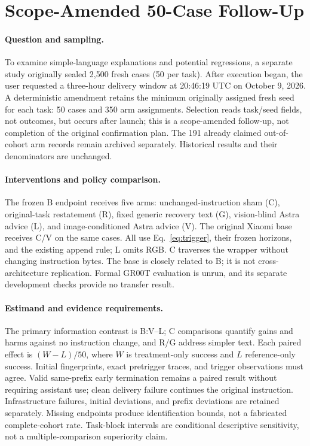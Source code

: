 \section{Scope-Amended 50-Case Follow-Up}
\label{sec:followup}
\paragraph{Question and sampling.}
To examine simple-language explanations and potential regressions, a separate study originally sealed 2,500 fresh cases (50 per task). After execution began, the user requested a three-hour delivery window at 20:46:19 UTC on October 9, 2026. A deterministic amendment retains the minimum originally assigned fresh seed for each task: 50 cases and 350 arm assignments. Selection reads task/seed fields, not outcomes, but occurs after launch; this is a scope-amended follow-up, not completion of the original confirmation plan. The 191 already claimed out-of-cohort arm records remain archived separately. Historical results and their denominators are unchanged.

\paragraph{Interventions and policy comparison.}
The frozen B endpoint receives five arms: unchanged-instruction sham (C), original-task restatement (R), fixed generic recovery text (G), vision-blind Astra advice (L), and image-conditioned Astra advice (V). The original Xiaomi base receives C/V on the same cases. All use Eq.~\ref{eq:trigger}, their frozen horizons, and the existing append rule; L omits RGB. C traverses the wrapper without changing instruction bytes. The base is closely related to B; it is not cross-architecture replication. Formal GR00T evaluation is unrun, and its separate development checks provide no transfer result.

\paragraph{Estimand and evidence requirements.}
The primary information contrast is B:V--L; C comparisons quantify gains and harms against no instruction change, and R/G address simpler text. Each paired effect is $(W-L)/50$, where $W$ is treatment-only success and $L$ reference-only success. Initial fingerprints, exact pretrigger traces, and trigger observations must agree. Valid same-prefix early termination remains a paired result without requiring assistant use; clean delivery failure continues the original instruction. Infrastructure failures, initial deviations, and prefix deviations are retained separately. Missing endpoints produce identification bounds, not a fabricated complete-cohort rate. Task-block intervals are conditional descriptive sensitivity, not a multiple-comparison superiority claim.


